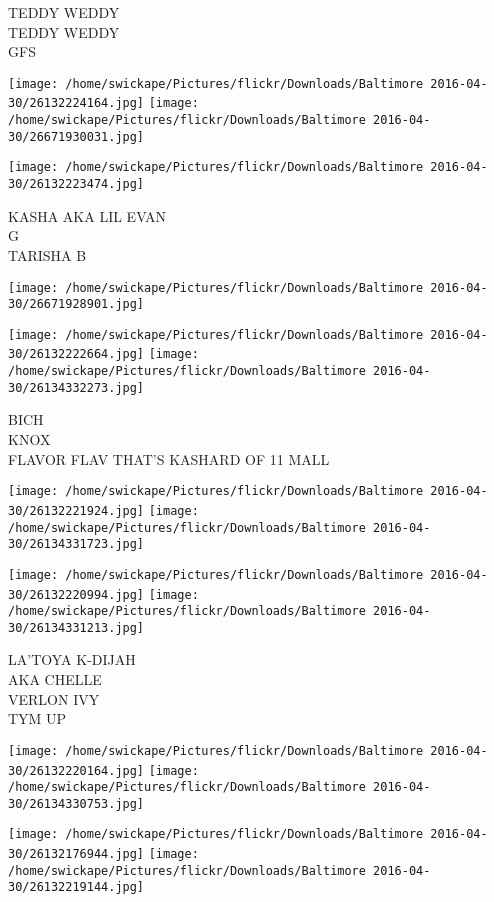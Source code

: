 \documentclass[10pt,letterpaper]{article}
\begin{document}
TEDDY WEDDY\\
TEDDY WEDDY\\
GFS
\pagebreak

\texttt{[image: /home/swickape/Pictures/flickr/Downloads/Baltimore 2016-04-30/26132224164.jpg]}
\texttt{[image: /home/swickape/Pictures/flickr/Downloads/Baltimore 2016-04-30/26671930031.jpg]}

\texttt{[image: /home/swickape/Pictures/flickr/Downloads/Baltimore 2016-04-30/26132223474.jpg]}

KASHA AKA LIL EVAN\\
G\\
TARISHA B
\pagebreak

\texttt{[image: /home/swickape/Pictures/flickr/Downloads/Baltimore 2016-04-30/26671928901.jpg]}

\vspace{0.25in}
\texttt{[image: /home/swickape/Pictures/flickr/Downloads/Baltimore 2016-04-30/26132222664.jpg]}
\texttt{[image: /home/swickape/Pictures/flickr/Downloads/Baltimore 2016-04-30/26134332273.jpg]}

BICH\\
KNOX\\
FLAVOR FLAV THAT'S KASHARD OF 11 MALL
\pagebreak

\texttt{[image: /home/swickape/Pictures/flickr/Downloads/Baltimore 2016-04-30/26132221924.jpg]}
\texttt{[image: /home/swickape/Pictures/flickr/Downloads/Baltimore 2016-04-30/26134331723.jpg]}

\texttt{[image: /home/swickape/Pictures/flickr/Downloads/Baltimore 2016-04-30/26132220994.jpg]}
\texttt{[image: /home/swickape/Pictures/flickr/Downloads/Baltimore 2016-04-30/26134331213.jpg]}

LA'TOYA K{-}DIJAH\\
AKA CHELLE\\
VERLON IVY\\
TYM UP
\pagebreak

\texttt{[image: /home/swickape/Pictures/flickr/Downloads/Baltimore 2016-04-30/26132220164.jpg]}
\texttt{[image: /home/swickape/Pictures/flickr/Downloads/Baltimore 2016-04-30/26134330753.jpg]}

\texttt{[image: /home/swickape/Pictures/flickr/Downloads/Baltimore 2016-04-30/26132176944.jpg]}
\texttt{[image: /home/swickape/Pictures/flickr/Downloads/Baltimore 2016-04-30/26132219144.jpg]}
\end{document}
